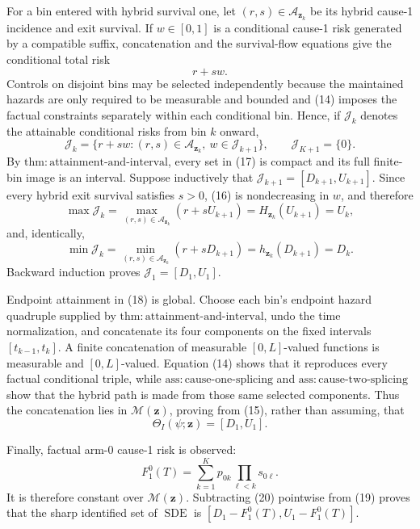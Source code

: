 For a bin entered with hybrid survival one, let \((r,s)\in\mathcal A_{\mathbf z_k}\) be its hybrid cause-1 incidence and exit survival.  If \(w\in[0,1]\) is a conditional cause-1 risk generated by a compatible suffix, concatenation and the survival-flow equations give the conditional total risk
\[
 r+s w.                                                        \tag{16}
\]
Controls on disjoint bins may be selected independently because the maintained hazards are only required to be measurable and bounded and (14) imposes the factual constraints separately within each conditional bin.  Hence, if \(\mathcal J_k\) denotes the attainable conditional risks from bin \(k\) onward,
\[
 \mathcal J_k=\{r+s w:(r,s)\in\mathcal A_{\mathbf z_k},\ w\in\mathcal J_{k+1}\},
 \quad\quad \mathcal J_{K+1}=\{0\}.                              \tag{17}
\]
By \(\mathrm{thm{:}attainment\text{-}and\text{-}interval}\), every set in (17) is compact and its full finite-bin image is an interval.  Suppose inductively that \(\mathcal J_{k+1}=[D_{k+1},U_{k+1}]\).  Since every hybrid exit survival satisfies \(s>0\), (16) is nondecreasing in \(w\), and therefore
\[
 \max\mathcal J_k
 =\max_{(r,s)\in\mathcal A_{\mathbf z_k}}(r+sU_{k+1})
 =H_{\mathbf z_k}(U_{k+1})=U_k,
\]
and, identically,
\[
 \min\mathcal J_k
 =\min_{(r,s)\in\mathcal A_{\mathbf z_k}}(r+sD_{k+1})
 =h_{\mathbf z_k}(D_{k+1})=D_k.                              \tag{18}
\]
Backward induction proves \(\mathcal J_1=[D_1,U_1]\).

Endpoint attainment in (18) is global.  Choose each bin's endpoint hazard quadruple supplied by \(\mathrm{thm{:}attainment\text{-}and\text{-}interval}\), undo the time normalization, and concatenate its four components on the fixed intervals \([t_{k-1},t_k]\).  A finite concatenation of measurable \([0,L]\)-valued functions is measurable and \([0,L]\)-valued.  Equation (14) shows that it reproduces every factual conditional triple, while \(\mathrm{ass{:}cause\text{-}one\text{-}splicing}\) and \(\mathrm{ass{:}cause\text{-}two\text{-}splicing}\) show that the hybrid path is made from those same selected components.  Thus the concatenation lies in \(\mathcal M(\mathbf z)\), proving from (15), rather than assuming, that
\[
 \Theta_I(\psi;\mathbf z)=[D_1,U_1].                         \tag{19}
\]

Finally, factual arm-0 cause-1 risk is observed:
\[
 F_1^0(T)=\sum_{k=1}^K p_{0k}\prod_{\ell<k}s_{0\ell}.        \tag{20}
\]
It is therefore constant over \(\mathcal M(\mathbf z)\).  Subtracting (20) pointwise from (19) proves that the sharp identified set of \(\operatorname{SDE}\) is \([D_1-F_1^0(T),U_1-F_1^0(T)]\).

